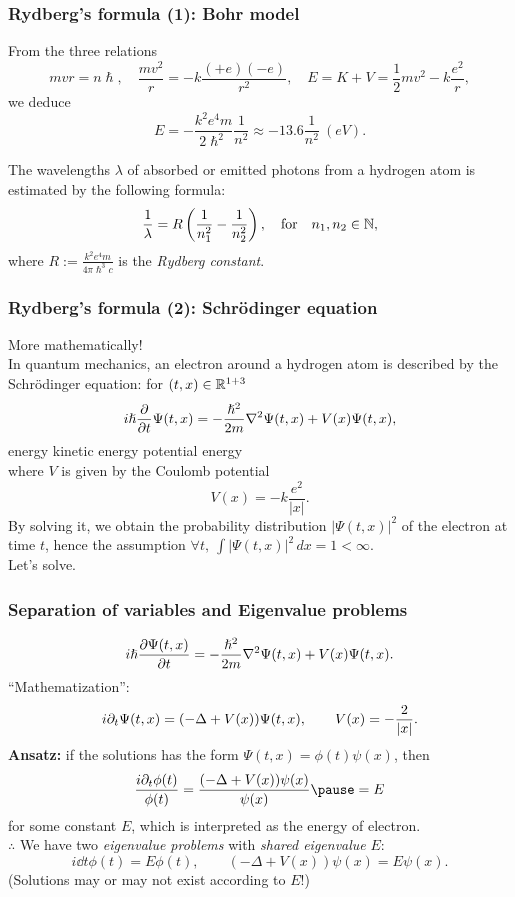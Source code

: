 \documentclass[10pt]{beamer}
\begin{document}
\begin{frame}
\frametitle{Rydberg's formula (1): Bohr model}
  From the three relations
  \[mvr=n\hslash,\quad\frac{mv^2}r=-k\frac{(+e)(-e)}{r^2},\quad E=K+V=\frac12mv^2-k\frac{e^2}r,\]
  \pause we deduce
  \[E=-\frac{k^2e^4m}{2\hslash^2}\frac1{n^2}\approx-13.6\frac1{n^2}\ (eV).\]
  \pause
  \begin{prop}
    The wavelengths $\lambda$ of absorbed or emitted photons from a hydrogen atom is estimated by the following formula:
    \[\frac1\lambda=R\left(\frac1{n_1^2}-\frac1{n_2^2}\right),\quad\text{for}\quad n_1,n_2\in\mathbb{N},\]
    where $R:=\frac{k^2e^4m}{4\pi\hslash^3c}$ is the \emph{Rydberg constant}.
  \end{prop}
\end{frame}

\begin{frame}
\frametitle{Rydberg's formula (2): Schr\"odinger equation}
  More mathematically!\\
  \pause In quantum mechanics, an electron around a hydrogen atom is described by the Schr\"odinger equation: for $(t,x)\in\mathbb{R}^{1+3}$
  \[i\hslash\pd{t}\Psi(t,x)=-\frac{\hslash^2}{2m}\del^2\Psi(t,x)+V(x)\Psi(t,x),\]
  \pause \hspace{6em} energy \hspace{2em} kinetic energy \hspace{1em} potential energy\\
  \bigskip
  \pause where $V$ is given by the Coulomb potential
  \[V(x)=-k\frac{e^2}{|x|}.\]
  \pause By solving it, we obtain the probability distribution $|\Psi(t,x)|^2$ of the electron at time $t$, hence the assumption $\forall t,\ \int|\Psi(t,x)|^2\,dx=1<\infty$.\\
  \pause Let's solve.
\end{frame}

\begin{frame}
\frametitle{Separation of variables and Eigenvalue problems}
  \[i\hslash\pd{\Psi(t,x)}{t}=-\frac{\hslash^2}{2m}\del^2\Psi(t,x)+V(x)\Psi(t,x).\]
  \pause ``Mathematization'':
  \[i\pd_t\Psi(t,x)=(-\Delta+V(x))\Psi(t,x),\qquad V(x)=-\frac2{|x|}.\]
  \pause \textbf{Ansatz:} if the solutions has the form $\Psi(t,x)=\phi(t)\psi(x)$, \pause then
  \[\frac{i\pd_t\phi(t)}{\phi(t)}=\frac{(-\Delta+V(x))\psi(x)}{\psi(x)}\pause=E\]
  for some constant $E$, which is interpreted as the energy of electron.\\
  \pause $\therefore$ We have two \emph{eigenvalue problems} with \emph{shared eigenvalue} $E$:
  \[i\dd{t}\phi(t)=E\phi(t),\qquad(-\Delta+V(x))\psi(x)=E\psi(x).\]
  (Solutions may or may not exist according to $E$!)
\end{frame}
\end{document}
